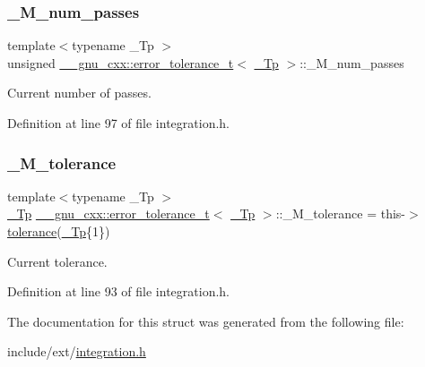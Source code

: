 \subsubsection{\texorpdfstring{\+\_\+\+M\+\_\+num\+\_\+passes}{\_M\_num\_passes}}
{\footnotesize\ttfamily template$<$typename \+\_\+\+Tp $>$ \\
unsigned \hyperlink{struct____gnu__cxx_1_1error__tolerance__t}{\+\_\+\+\_\+gnu\+\_\+cxx\+::error\+\_\+tolerance\+\_\+t}$<$ \hyperlink{namespace____gnu__cxx_a3b19a9c800ca194374ef9172290f7d79}{\+\_\+\+Tp} $>$\+::\+\_\+\+M\+\_\+num\+\_\+passes}



Current number of passes. 



Definition at line 97 of file integration.\+h.

\mbox{\label{struct____gnu__cxx_1_1error__tolerance__t_a261304757b9ff28304ee94d67405b2a6}} 
\subsubsection{\texorpdfstring{\+\_\+\+M\+\_\+tolerance}{\_M\_tolerance}}
{\footnotesize\ttfamily template$<$typename \+\_\+\+Tp $>$ \\
\hyperlink{namespace____gnu__cxx_a3b19a9c800ca194374ef9172290f7d79}{\+\_\+\+Tp} \hyperlink{struct____gnu__cxx_1_1error__tolerance__t}{\+\_\+\+\_\+gnu\+\_\+cxx\+::error\+\_\+tolerance\+\_\+t}$<$ \hyperlink{namespace____gnu__cxx_a3b19a9c800ca194374ef9172290f7d79}{\+\_\+\+Tp} $>$\+::\+\_\+\+M\+\_\+tolerance = this-\/$>$\hyperlink{struct____gnu__cxx_1_1error__tolerance__t_a2564721b5a7aae5f2a74703dd4c5248a}{tolerance}(\hyperlink{namespace____gnu__cxx_a3b19a9c800ca194374ef9172290f7d79}{\+\_\+\+Tp}\{1\})}



Current tolerance. 



Definition at line 93 of file integration.\+h.



The documentation for this struct was generated from the following file\+:\begin{DoxyCompactItemize}
\item 
include/ext/\hyperlink{integration_8h}{integration.\+h}\end{DoxyCompactItemize}
